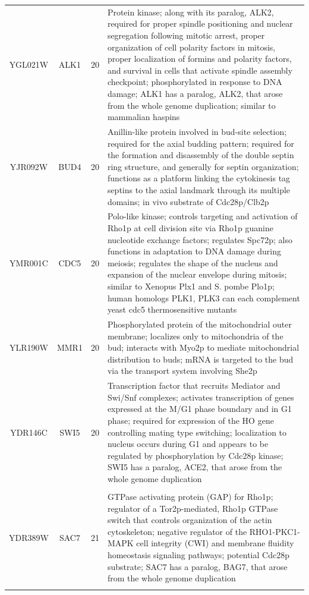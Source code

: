 \documentclass[]{article}
\begin{document}
\begin{longtable}{@{\extracolsep{3pt}} cccp{85mm}}
YGL021W & ALK1 & 20 & Protein kinase; along with its paralog, ALK2, required for proper spindle positioning and nuclear segregation following mitotic arrest, proper organization of cell polarity factors in mitosis, proper localization of formins and polarity factors, and survival in cells that activate spindle assembly checkpoint; phosphorylated in response to DNA damage; ALK1 has a paralog, ALK2, that arose from the whole genome duplication; similar to mammalian haspins \\ 
YJR092W & BUD4 & 20 & Anillin-like protein involved in bud-site selection; required for the axial budding pattern; required for the formation and disassembly of the double septin ring structure, and generally for septin organization; functions as a platform linking the cytokinesis tag septins to the axial landmark through its multiple domains; in vivo substrate of Cdc28p/Clb2p \\ 
YMR001C & CDC5 & 20 & Polo-like kinase; controls targeting and activation of Rho1p at cell division site via Rho1p guanine nucleotide exchange factors; regulates Spc72p; also functions in adaptation to DNA damage during meiosis; regulates the shape of the nucleus and expansion of the nuclear envelope during mitosis; similar to Xenopus Plx1 and S. pombe Plo1p; human homologs PLK1, PLK3 can each complement yeast cdc5 thermosensitive mutants \\ 
YLR190W & MMR1 & 20 & Phosphorylated protein of the mitochondrial outer membrane; localizes only to mitochondria of the bud; interacts with Myo2p to mediate mitochondrial distribution to buds; mRNA is targeted to the bud via the transport system involving She2p \\ 
YDR146C & SWI5 & 20 & Transcription factor that recruits Mediator and Swi/Snf complexes; activates transcription of genes expressed at the M/G1 phase boundary and in G1 phase; required for expression of the HO gene controlling mating type switching; localization to nucleus occurs during G1 and appears to be regulated by phosphorylation by Cdc28p kinase; SWI5 has a paralog, ACE2, that arose from the whole genome duplication \\   \hline \\ [-1.8ex] 
YDR389W & SAC7 & 21 & GTPase activating protein (GAP) for Rho1p; regulator of a Tor2p-mediated, Rho1p GTPase switch that controls organization of the actin cytoskeleton; negative regulator of the RHO1-PKC1-MAPK cell integrity (CWI) and membrane fluidity homeostasis signaling pathways; potential Cdc28p substrate; SAC7 has a paralog, BAG7, that arose from the whole genome duplication \\   \hline \\ [-1.8ex] 

\end{longtable}
\end{document}
